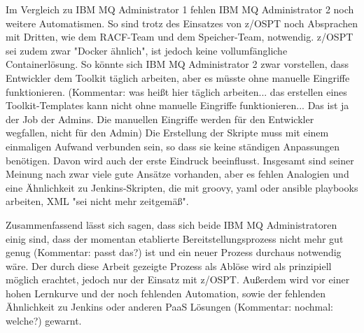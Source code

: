 Im Vergleich zu IBM MQ Administrator 1 fehlen IBM MQ Administrator 2 noch weitere Automatismen.
So sind trotz des Einsatzes von z/OSPT noch Absprachen mit Dritten, wie dem RACF-Team und dem Speicher-Team, notwendig.
z/OSPT sei zudem zwar "Docker ähnlich", ist jedoch keine vollumfängliche Containerlösung.
So könnte sich IBM MQ Administrator 2 zwar vorstellen, dass Entwickler dem Toolkit täglich  arbeiten, aber es müsste ohne manuelle Eingriffe funktionieren. (Kommentar: was heißt hier täglich arbeiten... das erstellen eines Toolkit-Templates kann nicht ohne manuelle Eingriffe funktionieren... Das ist ja der Job der Admins. Die manuellen Eingriffe werden für den Entwickler wegfallen, nicht für den Admin)
Die Erstellung der Skripte muss mit einem einmaligen Aufwand verbunden sein, so dass sie keine ständigen Anpassungen benötigen.
Davon wird auch der erste Eindruck beeinflusst.
Insgesamt sind seiner Meinung nach zwar viele gute Ansätze vorhanden, aber es fehlen Analogien und eine Ähnlichkeit zu Jenkins-Skripten, die mit groovy, yaml oder ansible playbooks arbeiten, XML "sei nicht mehr zeitgemäß". 

Zusammenfassend lässt sich sagen, dass sich beide IBM MQ Administratoren einig sind, dass der momentan etablierte Bereitstellungsprozess nicht mehr gut genug (Kommentar: passt das?) ist und ein neuer Prozess durchaus notwendig wäre.
Der durch diese Arbeit gezeigte Prozess als Ablöse wird als prinzipiell möglich erachtet, jedoch nur der Einsatz mit z/OSPT.
Außerdem wird vor einer hohen Lernkurve und der noch fehlenden Automation, sowie der fehlenden Ähnlichkeit zu Jenkins oder anderen PaaS Lösungen (Kommentar: nochmal: welche?) gewarnt.

